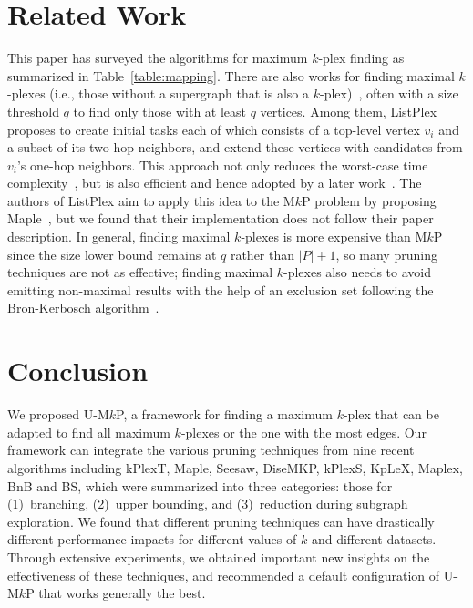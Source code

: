 \documentclass[sigconf, nonacm]{acmart}
\begin{document}
\section{Related Work}\label{sec:related}
This paper has surveyed the algorithms for maximum $k$-plex finding as summarized in Table~\ref{table:mapping}. There are also works for finding maximal $k$-plexes (i.e., those without a supergraph that is also a $k$-plex)~\cite{sigmod15,d2k,aaai2020maximal,cikm22maximal,www22maximal,maximal_qihao}, often with a size threshold $q$ to find only those with at least $q$ vertices. Among them, ListPlex~\cite{www22maximal} proposes to create initial tasks each of which consists of a top-level vertex $v_i$ and a subset of its two-hop neighbors, and extend these vertices with candidates from $v_i$'s one-hop neighbors. This approach not only reduces the worst-case time complexity~\cite{www22maximal}, but is also efficient and hence adopted by a later work~\cite{maximal_qihao}. The authors of ListPlex aim to apply this idea to the M$k$P problem by proposing Maple~\cite{Maple}, but we found that their implementation does not follow their paper description. In general, finding maximal $k$-plexes is more expensive than M$k$P since the size lower bound remains at $q$ rather than $|P|+1$, so many pruning techniques are not as effective; finding maximal $k$-plexes also needs to avoid emitting non-maximal results with the help of an exclusion set following the Bron-Kerbosch algorithm~\cite{bk}.

\vspace{-2mm}
\section{Conclusion}\label{sec:conclude}
We proposed U-M$k$P, a framework for finding a maximum $k$-plex that can be adapted to find all maximum $k$-plexes or the one with the most edges. Our framework can integrate the various pruning techniques from nine recent algorithms including kPlexT, Maple, Seesaw, DiseMKP, kPlexS, KpLeX, Maplex, BnB and BS, which were summarized into three categories: those for (1)~branching, (2)~upper bounding, and (3)~reduction during subgraph exploration. We found that different pruning techniques can have drastically different performance impacts for different values of $k$ and different datasets. Through extensive experiments, we obtained important new insights on the effectiveness of these techniques, and recommended a default configuration of U-M$k$P that works generally the best.
\end{document}
